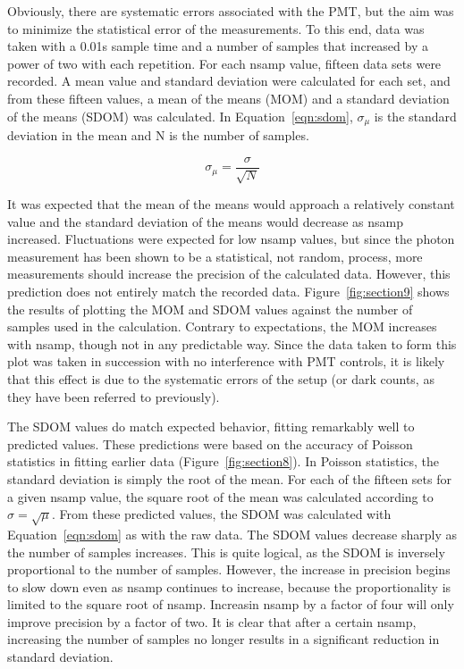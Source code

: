 \documentclass[a4paper,12pt]{article}
\begin{document}
Obviously, there are systematic errors associated with the PMT, but the aim was to minimize the statistical error of the measurements. To this end, data was taken with a 0.01s sample time and a number of samples that increased by a power of two with each repetition. For each nsamp value, fifteen data sets were recorded. A mean value and standard deviation were calculated for each set, and from these fifteen values, a mean of the means (MOM) and a standard deviation of the means (SDOM) was calculated. In Equation~\ref{eqn:sdom}, $\sigma_\mu$ is the standard deviation in the mean and N is the number of samples. 

\begin{equation}
\label{eqn:sdom}
\sigma_\mu=\frac{\sigma}{\sqrt{N}}
\end{equation}


It was expected that the mean of the means would approach a relatively constant value and the standard deviation of the means would decrease as nsamp increased. Fluctuations were expected for low nsamp values, but since the photon measurement has been shown to be a statistical, not random, process, more measurements should increase the precision of the calculated data. However, this prediction does not entirely match the recorded data. Figure~\ref{fig:section9} shows the results of plotting the MOM and SDOM values against the number of samples used in the calculation. Contrary to expectations, the MOM increases with nsamp, though not in any predictable way. Since the data taken to form this plot was taken in succession with no interference with PMT controls, it is likely that this effect is due to the systematic errors of the setup (or dark counts, as they have been referred to previously).

The SDOM values do match expected behavior, fitting remarkably well to predicted values. These predictions were based on the accuracy of Poisson statistics in fitting earlier data (Figure~\ref{fig:section8}). In Poisson statistics, the standard deviation is simply the root of the mean. For each of the fifteen sets for a given nsamp value, the square root of the mean was calculated according to $\sigma = \sqrt{\mu}$. From these predicted values, the SDOM was calculated with Equation~\ref{eqn:sdom} as with the raw data.  The SDOM values decrease sharply as the number of samples increases. This is quite logical, as the SDOM is inversely proportional to the number of samples. However, the increase in precision begins to slow down even as nsamp continues to increase, because the proportionality is limited to the square root of nsamp. Increasin nsamp by a factor of four will only improve precision by a factor of two. It is clear that after a certain nsamp, increasing the number of samples no longer results in a significant reduction in standard deviation.
\end{document}
